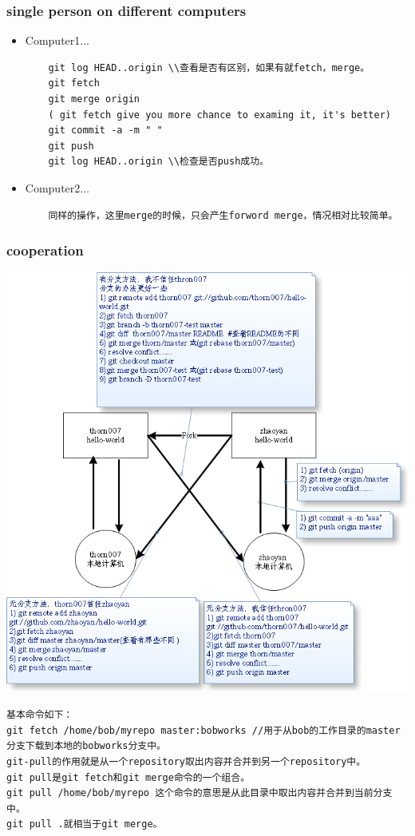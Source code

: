 \documentclass[a4paper,12pt,twoside]{book}
\begin{document}
\begin{CJK*}{UTF8}{song}
\subsubsection{single person on different computers }
\begin{itemize}
	\item Computer1...
    \begin{verbatim}
    git log HEAD..origin \\查看是否有区别，如果有就fetch，merge。
    git fetch
    git merge origin
    ( git fetch give you more chance to examing it, it's better)
    git commit -a -m " "
    git push
    git log HEAD..origin \\检查是否push成功。
    \end{verbatim}
    \item Computer2...
    \begin{verbatim}
    同样的操作，这里merge的时候，只会产生forword merge，情况相对比较简单。
    \end{verbatim}
\end{itemize}

\subsubsection{cooperation}
\includegraphics[scale=0.8]{pics/git-corp} \\
\begin{verbatim}
基本命令如下：
git fetch /home/bob/myrepo master:bobworks //用于从bob的工作目录的master分支下载到本地的bobworks分支中。
git-pull的作用就是从一个repository取出内容并合并到另一个repository中。
git pull是git fetch和git merge命令的一个组合。
git pull /home/bob/myrepo 这个命令的意思是从此目录中取出内容并合并到当前分支中。
git pull .就相当于git merge。


\end{verbatim}
\end{CJK*}
\end{document}
